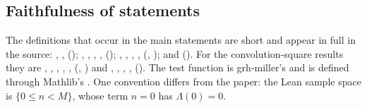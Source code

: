 \subsection{Faithfulness of statements}
The definitions that occur in the main statements are short and appear in full in the source:
, ,  (); , ,
, ,  (); , , , ,
 (, ); and  (). For the convolution-square results they are , ,
, , ,  (, ) and
, , , ,  (). The test
function  is grh-miller's and is defined through Mathlib's . One
convention differs from the paper: the Lean sample space is $\{0\le n<M\}$, whose term $n=0$ has $\Lambda(0)=0$.
